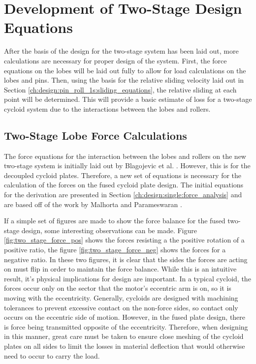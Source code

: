 \section{Development of Two-Stage Design Equations} \label{ch:dual:equations}

After the basis of the design for the two-stage system has been laid out, more calculations are necessary for proper design of the system. First, the force equations on the lobes will be laid out fully to allow for load calculations on the lobes and pins. Then, using the basis for the relative sliding velocity laid out in Section \ref{ch:design:pin_roll_1s:sliding_equations}, the relative sliding at each point will be determined. This will provide a basic estimate of loss for a two-stage cycloid system due to the interactions between the lobes and rollers. 

\subsection{Two-Stage Lobe Force Calculations} \label{ch:dual:equtions:force}

The force equations for the interaction between the lobes and rollers on the new two-stage system is initially laid out by Blagojevic et al. \cite{ref:new_two_stage}. However, this is for the decoupled cycloid plates. Therefore, a new set of equations is necessary for the calculation of the forces on the fused cycloid plate design. The initial equations for the derivation are presented in Section \ref{ch:design:single:force_analysis} and are based off of the work by Malhorta and Parameswaran \cite{ref:malhorta}. 

If a simple set of figures are made to show the force balance for the fused two-stage design, some interesting observations can be made. Figure \ref{fig:two_stage_force_pos} shows the forces resisting a the positive rotation of a positive ratio, the figure \ref{fig:two_stage_force_neg} shows the forces for a negative ratio. In these two figures, it is clear that the sides the forces are acting on must flip in order to maintain the force balance. While this is an intuitive result, it's physical implications for design are important. In a typical cycloid, the forces occur only on the sector that the motor's eccentric arm is on, so it is moving with the eccentricity. Generally, cycloids are designed with machining tolerances to prevent excessive contact on the non-force sides, so contact only occurs on the eccentric side of motion. However, in the fused plate design, there is force being transmitted opposite of the eccentricity. Therefore, when designing in this manner, great care must be taken to ensure close meshing of the cycloid plates on all sides to limit the losses in material deflection that would otherwise need to occur to carry the load. 


